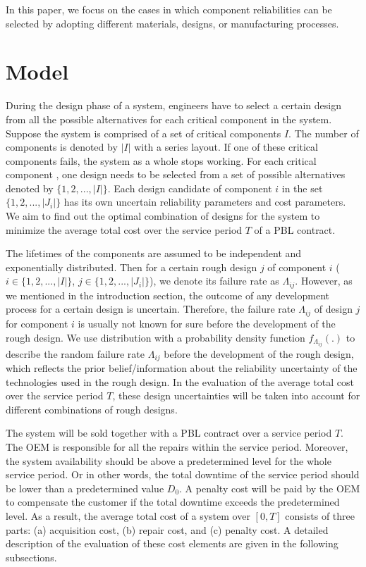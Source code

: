 \documentclass[preprint,12pt]{elsarticle}
\begin{document}
In this paper, we focus on the cases in which component reliabilities can be selected by adopting different materials, designs, or manufacturing processes.

\section{Model}
During the design phase of a system, engineers have to select a certain design from all the possible alternatives for each critical component in the system. Suppose the system is comprised of a set of critical components $I$. The number of components is denoted by $\lvert I \rvert$ with a series layout. If one of these critical components fails, the system as a whole stops working. For each critical component , one design needs to be selected from a set of possible alternatives denoted by $\{1,2,...,\lvert I \rvert \}$. Each design candidate of component $i$ in the set $\{1,2,...,\lvert J_{i}\rvert\}$ has its own uncertain reliability parameters and cost parameters. We aim to find out the optimal combination of designs for the system to minimize the average total cost over the service period $T$ of a PBL contract.

The lifetimes of the components are assumed to be independent and exponentially distributed. Then for a certain rough design $j$ of component $i$ ($i \in \{1,2,...,\lvert I \rvert\}$, $j \in \{1,2,...,\lvert J_{i} \rvert\}$), we denote its failure rate as $\Lambda_{ij}$. However, as we mentioned in the introduction section, the outcome of any development process for a certain design is uncertain. Therefore, the failure rate $\Lambda_{ij}$ of design $j$ for component $i$ is usually not known for sure before the development of the rough design. We use distribution with a probability density function $f_{\Lambda_{ij}}(.)$ to describe the random failure rate $\Lambda_{ij}$ before the development of the rough design, which reflects the prior belief/information about the reliability uncertainty of the technologies used in the rough design. In the evaluation of the average total cost over the service period $T$, these design uncertainties will be taken into account for different combinations of rough designs.

The system will be sold together with a PBL contract over a service period $T$. The OEM is responsible for all the repairs within the service period. Moreover, the system availability should be above a predetermined level for the whole service period. Or in other words, the total downtime of the service period should be lower than a predetermined value $D_0$. A penalty cost will be paid by the OEM to compensate the customer if the total downtime exceeds the predetermined level. As a result, the average total cost of a system over $[0, T]$ consists of three parts: (a) acquisition cost, (b) repair cost, and (c) penalty cost. A detailed description of the evaluation of these cost elements are given in the following subsections.
\end{document}
